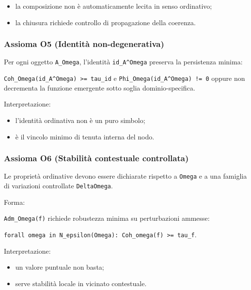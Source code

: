 \begin{itemize}
\tightlist
\item
  la composizione non è automaticamente lecita in senso ordinativo;
\item
  la chiusura richiede controllo di propagazione della coerenza.
\end{itemize}

\subsubsection{Assioma O5 (Identità non-degenerativa)}

Per ogni oggetto \texttt{A\_Omega}, l'identità \texttt{id\_A\^{}Omega} preserva la persistenza minima:

\texttt{Coh\_Omega(id\_A\^{}Omega)\ \textgreater{}=\ tau\_id} e \texttt{Phi\_Omega(id\_A\^{}Omega)\ !=\ 0} oppure non decrementa la funzione emergente sotto soglia dominio-specifica.

Interpretazione:

\begin{itemize}
\tightlist
\item
  l'identità ordinativa non è un puro simbolo;
\item
  è il vincolo minimo di tenuta interna del nodo.
\end{itemize}

\subsubsection{Assioma O6 (Stabilità contestuale controllata)}

Le proprietà ordinative devono essere dichiarate rispetto a \texttt{Omega} e a una famiglia di variazioni controllate \texttt{DeltaOmega}.

Forma:

\texttt{Adm\_Omega(f)} richiede robustezza minima su perturbazioni ammesse:

\texttt{forall\ omega\textquotesingle{}\ in\ N\_epsilon(Omega):\ Coh\_omega\textquotesingle{}(f)\ \textgreater{}=\ tau\textquotesingle{}\_f}.

Interpretazione:

\begin{itemize}
\tightlist
\item
  un valore puntuale non basta;
\item
  serve stabilità locale in vicinato contestuale.
\end{itemize}

